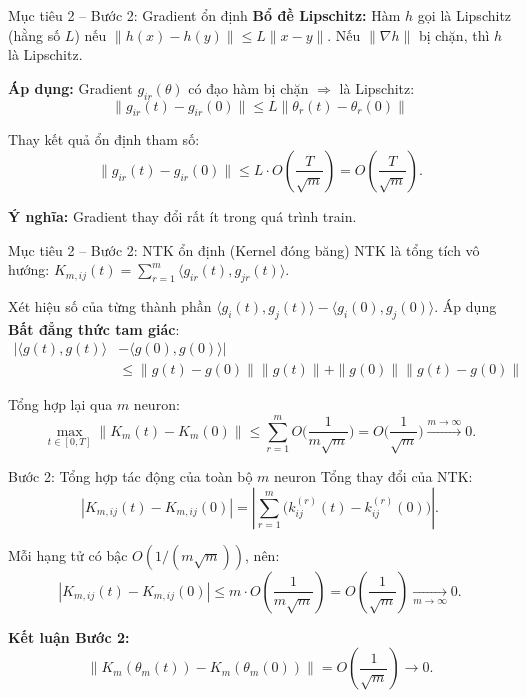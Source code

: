 \begin{frame}{Mục tiêu 2 – Bước 2: Gradient ổn định}
  \textbf{Bổ đề Lipschitz:}
  Hàm $h$ gọi là Lipschitz (hằng số $L$) nếu $\|h(x)-h(y)\| \le L\|x-y\|$.
  Nếu $\|\nabla h\|$ bị chặn, thì $h$ là Lipschitz.

  \vspace{0.2cm}
  \textbf{Áp dụng:} Gradient $g_{ir}(\theta)$ có đạo hàm bị chặn $\Rightarrow$ là Lipschitz:
  \[
    \|g_{ir}(t) - g_{ir}(0)\| \le L \|\theta_r(t) - \theta_r(0)\|
  \]
  
  Thay kết quả ổn định tham số:
  \[
    \|g_{ir}(t) - g_{ir}(0)\| \le L \cdot O\left(\frac{T}{\sqrt{m}}\right) = O\left(\frac{T}{\sqrt{m}}\right).
  \]

  \textbf{Ý nghĩa:} Gradient thay đổi rất ít trong quá trình train.
\end{frame}

\begin{frame}{Mục tiêu 2 – Bước 2: NTK ổn định (Kernel đóng băng)}
  NTK là tổng tích vô hướng: $K_{m,ij}(t) = \sum_{r=1}^m \langle g_{ir}(t), g_{jr}(t) \rangle$.

  Xét hiệu số của từng thành phần $\langle g_i(t), g_j(t) \rangle - \langle g_i(0), g_j(0) \rangle$.
  Áp dụng \textbf{Bất đẳng thức tam giác}:
  \[
    \begin{aligned}
      |\langle g(t), g(t) \rangle &- \langle g(0), g(0) \rangle| \\
      &\le \|g(t)-g(0)\|\|g(t)\| + \|g(0)\|\|g(t)-g(0)\|
    \end{aligned}
  \]
  
  Tổng hợp lại qua $m$ neuron:
  \[
    \max_{t \in [0,T]} \|K_m(t) - K_m(0)\| \le \sum_{r=1}^m O\Big(\frac{1}{m\sqrt{m}}\Big) = O\Big(\frac{1}{\sqrt{m}}\Big) \xrightarrow{m \to \infty} 0.
  \]

\end{frame}

\begin{frame}{Bước 2: Tổng hợp tác động của toàn bộ $m$ neuron}
Tổng thay đổi của NTK:
\[
  |K_{m,ij}(t) - K_{m,ij}(0)|
  = \left|\sum_{r=1}^m \big(k_{ij}^{(r)}(t) - k_{ij}^{(r)}(0)\big)\right|.
\]

Mỗi hạng tử có bậc $O(1/(m\sqrt{m}))$, nên:
\[
  |K_{m,ij}(t) - K_{m,ij}(0)|
  \le
  m \cdot O\!\left(\frac{1}{m\sqrt{m}}\right)
  = O\!\left(\frac{1}{\sqrt{m}}\right)
  \xrightarrow[m\to\infty]{}
  0.
\]

\textbf{Kết luận Bước 2:}
\[
  \|K_m(\theta_m(t)) - K_m(\theta_m(0))\|
  = O\!\left(\frac{1}{\sqrt{m}}\right)
  \to 0.
\]
\end{frame}

